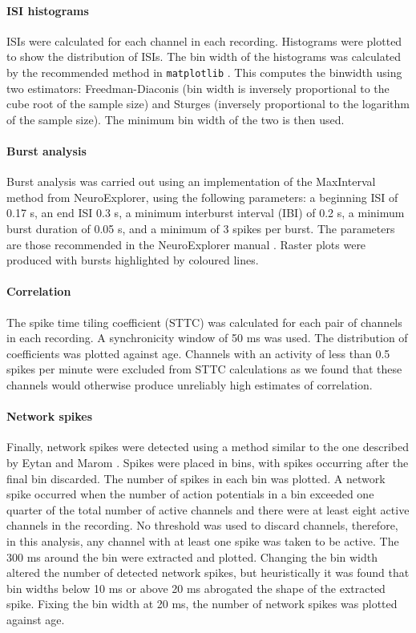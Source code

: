 \documentclass[doublespacing]{bmcart}
\begin{document}
\paragraph{ISI histograms} ISIs were calculated for each channel in each recording. Histograms were plotted to show the distribution of ISIs. The bin width of the histograms was calculated by the recommended method in \texttt{matplotlib} \cite{Community2020-xp}. This computes the binwidth using two estimators: Freedman-Diaconis (bin width is inversely proportional to the cube root of the sample size) and Sturges (inversely proportional to the logarithm of the sample size). The minimum bin width of the two is then used.

\paragraph{Burst analysis} Burst analysis was carried out using an implementation of the MaxInterval method from NeuroExplorer, using the following parameters: a beginning ISI of 0.17 s, an end ISI 0.3 s, a minimum interburst interval (IBI) of 0.2 s, a minimum burst duration of 0.05 s, and a minimum of 3 spikes per burst. The parameters are those recommended in the NeuroExplorer manual \cite{neuroexplorer2020}. Raster plots were produced with bursts highlighted by coloured lines.

\paragraph{Correlation} The spike time tiling coefficient (STTC) \cite{Cutts2014} was calculated for each pair of channels in each recording. A synchronicity window of 50 ms was used. The distribution of coefficients was plotted against age. Channels with an activity of less than 0.5 spikes per minute were excluded from STTC calculations as we found that these channels would otherwise produce unreliably high estimates of correlation. 

\paragraph{Network spikes} Finally, network spikes were detected using a method similar to the one described by Eytan and Marom \cite{Eytan2006}. Spikes were placed in bins, with spikes occurring after the final bin discarded. The number of spikes in each bin was plotted. A network spike occurred when the number of action potentials in a bin exceeded one quarter of the total number of active channels and there were at least eight active channels in the recording. No threshold was used to discard channels, therefore, in this analysis, any channel with at least one spike was taken to be active. The 300 ms around the bin were extracted and plotted. Changing the bin width altered the number of detected network spikes, but heuristically it was found that bin widths below 10 ms or above 20 ms abrogated the shape of the extracted spike. Fixing the bin width at 20 ms, the number of network spikes was plotted against age.
\end{document}

